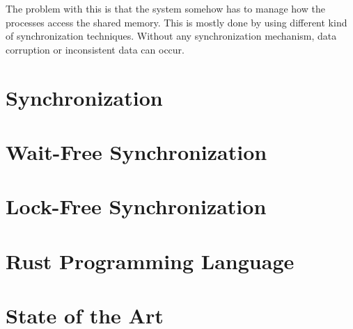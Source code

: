 The problem with this is that the system somehow has to manage how the processes access the shared memory. This is mostly done by using different kind of synchronization techniques. Without any synchronization mechanism, data corruption or inconsistent data can occur. \cite{IPCMechanisms, SharedMemory}

\section{Synchronization}\label{sec:synchronization}



\section{Wait-Free Synchronization}\label{sec:wait-free}

\section{Lock-Free Synchronization}\label{sec:lock-free}

\section{Rust Programming Language}\label{sec:rust}

\section{State of the Art}\label{sec:state-of-the-art}